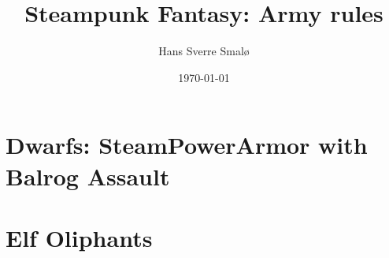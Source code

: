 \documentclass[a4,12pt, color, hyperref]{book}
\title{Steampunk Fantasy: Army rules}
\author{Hans Sverre Smalø}
\date{\today}
\begin{document}
\maketitle
\setcounter{tocdepth}{1}
\tableofcontents

%

\chapter{Dwarfs: SteamPowerArmor with Balrog Assault}


\chapter{Elf Oliphants}

\end{document}

